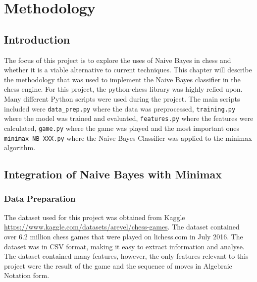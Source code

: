 \chapter{Methodology}

\section{Introduction}
The focus of this project is to explore the uses of Naive Bayes in chess and whether it is a viable alternative to current techniques. This chapter will describe the methodology that was used to implement the Naive Bayes classifier in the chess engine. For this project, the python-chess library was highly relied upon. Many different Python scripts were used during the project. The main scripts included were \texttt{data\_prep.py} where the data was preprocessed, \texttt{training.py} where the model was trained and evaluated, \texttt{features.py} where the features were calculated, \texttt{game.py} where the game was played and the most important ones \texttt{minimax\_NB\_XXX.py} where the Naive Bayes Classifier was applied to the minimax algorithm.


\section{Integration of Naive Bayes with Minimax}

\subsection{Data Preparation}

The dataset used for this project was obtained from Kaggle \cite{ChessGameDataset} \url{https://www.kaggle.com/datasets/arevel/chess-games}. The dataset contained over 6.2 million chess games that were played on lichess.com in July 2016. The dataset was in CSV format, making it easy to extract information and analyse. The dataset contained many features, however, the only features relevant to this project were the result of the game and the sequence of moves in Algebraic Notation form.

